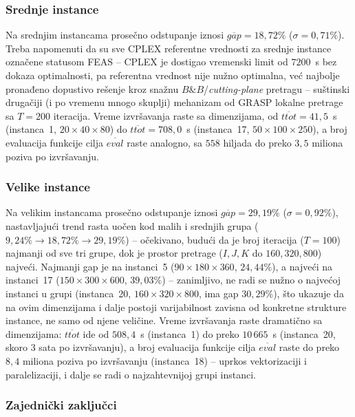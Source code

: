\documentclass[12pt,a4paper]{article}
\begin{document}
\subsubsection{Srednje instance}

Na srednjim instancama prosečno odstupanje iznosi $\overline{gap} =
18{,}72\%$ ($\sigma = 0{,}71\%$). Treba napomenuti da su sve CPLEX
referentne vrednosti za srednje instance označene statusom FEAS -- CPLEX
je dostigao vremenski limit od $7200$~s bez dokaza optimalnosti, pa
referentna vrednost nije nužno optimalna, već najbolje pronađeno dopustivo
rešenje kroz snažnu $B\&B$/\textit{cutting-plane} pretragu -- suštinski
drugačiji (i po vremenu mnogo skuplji) mehanizam od GRASP lokalne
pretrage sa $T=200$ iteracija.
Vreme izvršavanja raste sa dimenzijama, od $\overline{ttot}=41{,}5$~s
(instanca~1, $20\times40\times80$) do $\overline{ttot}=708{,}0$~s
(instanca~17, $50\times100\times250$), a broj evaluacija funkcije cilja
$\overline{eval}$ raste analogno, sa $558$ hiljada do preko $3{,}5$ miliona
poziva po izvršavanju.

\subsubsection{Velike instance}

Na velikim instancama prosečno odstupanje iznosi $\overline{gap} =
29{,}19\%$ ($\sigma = 0{,}92\%$), nastavljajući trend rasta uočen kod
malih i srednjih grupa ($9{,}24\%\to18{,}72\%\to29{,}19\%$) -- očekivano,
budući da je broj iteracija ($T=100$) najmanji od sve tri grupe, dok je
prostor pretrage ($I,J,K$ do $160,320,800$) najveći.
Najmanji gap je na instanci~5 ($90\times180\times360$, $24{,}44\%$), a
najveći na instanci~17 ($150\times300\times600$, $39{,}03\%$) --
zanimljivo, ne radi se nužno o najvećoj instanci u grupi (instanca~20,
$160\times320\times800$, ima gap $30{,}29\%$), što ukazuje da na ovim
dimenzijama i dalje postoji varijabilnost zavisna od konkretne strukture
instance, ne samo od njene veličine.
Vreme izvršavanja raste dramatično sa dimenzijama: $\overline{ttot}$ ide
od $508{,}4$~s (instanca~1) do preko $10\,665$~s (instanca~20, skoro
3 sata po izvršavanju), a broj evaluacija funkcije cilja $\overline{eval}$
raste do preko $8{,}4$ miliona poziva po izvršavanju (instanca~18) --
uprkos vektorizaciji i paralelizaciji, i dalje se radi o najzahtevnijoj
grupi instanci.

\subsubsection{Zajednički zaključci}
\end{document}
